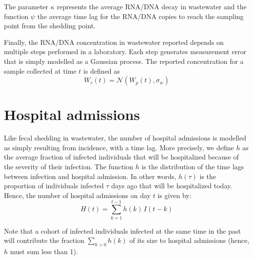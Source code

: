 \documentclass[11pt]{article} %
\newcommand{\warning}[1]{\textcolor{RedOrange}{\textbf{#1}}}
\begin{document}
The parameter $\kappa$ represents the average RNA/DNA decay in wastewater and the function $\psi$ the average time lag for the RNA/DNA copies to reach the sampling point from the shedding point.

Finally, the RNA/DNA concentration in wastewater reported depends on multiple steps performed in a laboratory. Each step generates measurement error that is simply modelled as a Gaussian process. 
The reported concentration for a sample collected at time $t$ is defined as
\begin{equation}
W_r(t) = \mathcal{N}(W_p(t), \sigma_w)
\end{equation}



\section{Hospital admissions}

Like fecal shedding in wastewater, the number of hospital admissions is modelled as simply resulting from incidence, with a time lag. 
More precisely, we define $h$ as the average fraction of infected individuals that will be hospitalized because of the severity of their infection. 
The function $h$ is the distribution of the time lags between infection and hospital admission. In other words, $h(\tau)$ is the proportion of individuals infected $\tau$ days ago that will be hospitalized today. 
Hence, the number of hospital admissions on day $t$ is given by:
\begin{equation}
H(t) = \sum_{k=1}^{t-1} h(k) \, I(t-k)
\end{equation}

Note that a cohort of infected individuals infected at the same time in the past will contribute the fraction $\sum_{k>0} h(k)$ of its size to hospital admissions (hence, $h$ must sum less than 1).





%
%
%
%
%
%
\end{document}
